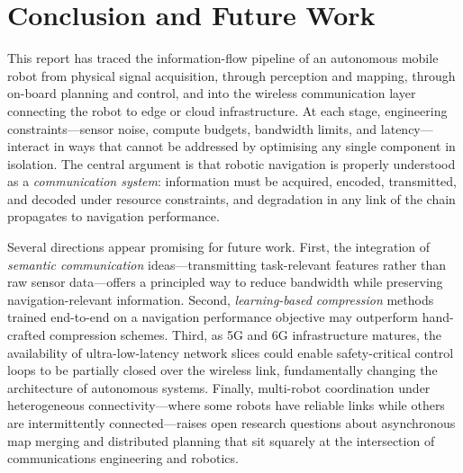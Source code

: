 \section{Conclusion and Future Work}

This report has traced the information-flow pipeline of an autonomous mobile robot from
physical signal acquisition, through perception and mapping, through on-board planning
and control, and into the wireless communication layer connecting the robot to edge or
cloud infrastructure.
At each stage, engineering constraints---sensor noise, compute budgets, bandwidth limits,
and latency---interact in ways that cannot be addressed by optimising any single component
in isolation.
The central argument is that robotic navigation is properly understood as a
\emph{communication system}: information must be acquired, encoded, transmitted, and
decoded under resource constraints, and degradation in any link of the chain propagates
to navigation performance.

Several directions appear promising for future work.
First, the integration of \emph{semantic communication} ideas---transmitting task-relevant
features rather than raw sensor data---offers a principled way to reduce bandwidth
while preserving navigation-relevant information.
Second, \emph{learning-based compression} methods trained end-to-end on a navigation
performance objective may outperform hand-crafted compression schemes.
Third, as 5G and 6G infrastructure matures, the availability of ultra-low-latency
network slices could enable safety-critical control loops to be partially closed over
the wireless link, fundamentally changing the architecture of autonomous systems.
Finally, multi-robot coordination under heterogeneous connectivity---where some robots
have reliable links while others are intermittently connected---raises open research
questions about asynchronous map merging and distributed planning that sit squarely at
the intersection of communications engineering and robotics.
